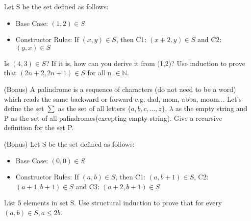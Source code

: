 \documentclass[solution, letterpaper]{cs20inclass}
\begin{document}
\problem Let S be the set defined as follows:
\begin{itemize}
\item Base Case: $(1,2) \in S$
\item Constructor Rules: If $(x,y)\in S$, then C1: $(x+2, y) \in S$ and C2: $(y,x) \in S$ 
\end{itemize}
\subproblem Is $(4,3)\in S$? If it is, how can you derive it from (1,2)?
\subproblem Use induction to prove that $(2n+2, 2n+1)\in S$ for all n $\in \mathbb{N}$.
\pagebreak

\problem (Bonus) A palindrome is a sequence of characters (do not need to be a word) which reads the same backward or forward e.g. dad, mom, abba, moom... Let's define the set $\sum$ as the set of all letters $\{a,b,c,...,z\}$, $\lambda$ as the empty string and P as the set of all palindromes(excepting empty string). Give a recursive definition for the set P.

\problem(Bonus) Let S be the set defined as follows:
\begin{itemize}
\item Base Case: $(0,0) \in S$
\item Constructor Rules: If $(a,b)\in S$, then C1: $(a, b+1) \in S$, C2: $(a+1,b+1)\in S$ and C3: $(a+2, b+1)\in S$ 
\end{itemize}
\subproblem List 5 elements in set S.
\subproblem Use structural induction to prove that for every $(a,b)\in S, a\leq 2b$.
\end{document}
